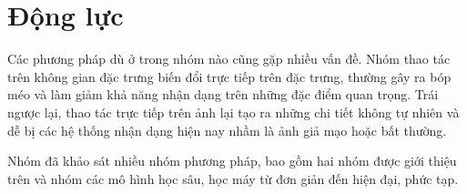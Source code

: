 \section{Động lực}
\label{sec::dong-luc}

Các phương pháp dù ở trong nhóm nào cũng gặp nhiều vấn đề. Nhóm thao tác trên không gian đặc trưng biến đổi trực tiếp trên đặc trưng, thường gây ra bóp méo và làm giảm khả năng nhận dạng trên những đặc điểm quan trọng. Trái ngược lại, thao tác trực tiếp trên ảnh lại tạo ra những chi tiết không tự nhiên và dễ bị các hệ thống nhận dạng hiện nay nhầm là ảnh giả mạo hoặc bất thường.

Nhóm đã khảo sát nhiều nhóm phương pháp, bao gồm hai nhóm được giới thiệu trên và nhóm các mô hình học sâu, học máy từ đơn giản đến hiện đại, phức tạp.